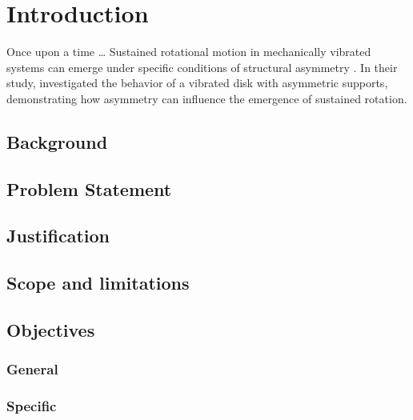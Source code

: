 \chapter{Introduction}
\label{cha:introduction}
Once upon a time  \ldots
Sustained rotational motion in mechanically vibrated systems
can emerge under specific conditions of structural asymmetry
\parencite{peraza2019sustained}. In their study,
\textcite{peraza2019sustained} investigated the behavior
of a vibrated disk with asymmetric supports, demonstrating
how asymmetry can influence the emergence of sustained rotation.\section{Background}
\section{Problem Statement}
\section{Justification}
\section{Scope and limitations}
\section{Objectives}
\subsection {General}
\subsection {Specific}

